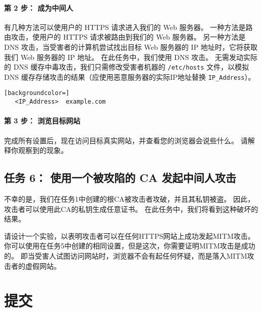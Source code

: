 \paragraph{第 2 步： 成为中间人}
有几种方法可以使用户的 HTTPS 请求进入我们的 Web 服务器。
一种方法是路由攻击，使用户的 HTTPS 请求被路由到我们的 Web 服务器。
另一种方法是 DNS 攻击，当受害者的计算机尝试找出目标 Web 服务器的 IP 地址时，它将获取我们 Web 服务器的 IP 地址。
在此任务中，我们使用 DNS 攻击。 无需发动实际的 DNS 缓存中毒攻击，我们只需修改受害者机器的 \texttt{/etc/hosts} 文件，以模拟 DNS 缓存存储攻击的结果（应使用恶意服务器的实际IP地址替换 \texttt{IP\_Address}）。



\begin{lstlisting}[backgroundcolor=]
   <IP_Address>  example.com
\end{lstlisting}


\paragraph{第 3 步： 浏览目标网站}
完成所有设置后，现在访问目标真实网站，并查看您的浏览器会说些什么。
请解释你观察到的现象。




\subsection{任务 6： 使用一个被攻陷的 CA 发起中间人攻击}

不幸的是，我们在任务1中创建的根CA被攻击者攻破，并且其私钥被盗。
因此，攻击者可以使用此CA的私钥生成任意证书。
在此任务中，我们将看到这种破坏的结果。



请设计一个实验，以表明攻击者可以在任何HTTPS网站上成功发起MITM攻击。
你可以使用在任务5中创建的相同设置，但是这次，你需要证明MITM攻击是成功的。
即当受害人试图访问网站时，浏览器不会有起任何怀疑，而是落入MITM攻击者的虚假网站。




\section{提交}

\seedsubmission




